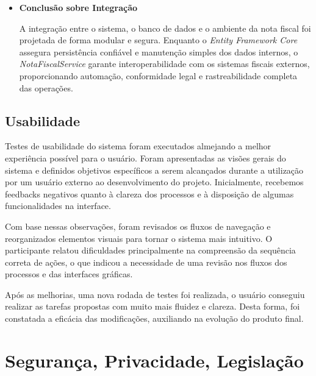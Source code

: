 \documentclass[
	12pt,				%
	openany,			%
	twoside,			%
	a4paper,			%
	english,			%
	brazil				%
	]{abntex2}
\begin{document}
\begin{itemize}
\begin{itemize}
 \item \textbf{Automatização da emissão de notas após o registro de vendas ou movimentações.}
 \item \textbf{Sincronização de status fiscais (autorização, cancelamento, inutilização)}
 \item \textbf{Segurança no tráfego de dados por meio de HTTPS e certificados digitais válidos.}
\end{itemize}

 \item \textbf{Conclusão sobre Integração}

A integração entre o sistema, o banco de dados e o ambiente da nota fiscal foi projetada de forma modular e segura. Enquanto o  \textit{Entity Framework Core} assegura persistência confiável e manutenção simples dos dados internos, o  \textit{NotaFiscalService} garante interoperabilidade com os sistemas fiscais externos, proporcionando automação, conformidade legal e rastreabilidade completa das operações.

\end{itemize}

\subsection{Usabilidade}

Testes de usabilidade do sistema foram executados almejando a melhor experiência possível para o usuário. Foram apresentadas as visões gerais do sistema e definidos objetivos específicos a serem alcançados durante a utilização por um usuário externo ao desenvolvimento do projeto. Inicialmente, recebemos feedbacks negativos quanto à clareza dos processos e à disposição de algumas funcionalidades na interface.

Com base nessas observações, foram revisados os fluxos de navegação e reorganizados elementos visuais para tornar o sistema mais intuitivo. O participante relatou dificuldades principalmente na compreensão da sequência correta de ações, o que indicou a necessidade de uma revisão nos fluxos dos processos e das interfaces gráficas.

Após as melhorias, uma nova rodada de testes foi realizada, o usuário conseguiu realizar as tarefas propostas com muito mais fluidez e clareza. Desta forma, foi constatada a eficácia das modificações, auxiliando na evolução do produto final.



\section{Segurança, Privacidade, Legislação}
\end{document}
